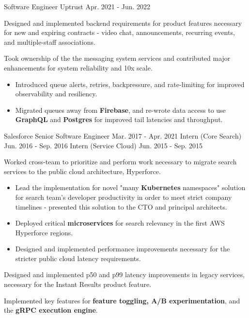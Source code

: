 
\begin{cventries}

  \cventry
    {Software Engineer} %
    {Uptrust} %
    {} %
    {Apr. 2021 - Jun. 2022} %
    {
      \begin{cvitems} %
        \item {Designed and implemented backend requirements for product features necessary for new and expiring contracts - video chat, announcements, recurring events, and multiple-staff associations.}
        \item {Took ownership of the the messaging system services and contributed major enhancements for system reliability and 10x scale.}
        \begin{itemize}
          \item {Introduced queue alerts, retries, backpressure, and rate-limiting for improved observability and resiliency.}
          \item {Migrated queues away from \textbf{Firebase}, and re-wrote data access to use \textbf{GraphQL} and \textbf{Postgres} for improved tail latencies and throughput.}
        \end{itemize}
      \end{cvitems}
    }

  \cvthreeentry
    {Salesforce} %
    {} %
    {Senior Software Engineer}
    {Mar. 2017 - Apr. 2021}
    {Intern (Core Search)}
    {Jun. 2016 - Sep. 2016}
    {Intern (Service Cloud)}
    {Jun. 2015 - Sep. 2015}
    {
      \begin{cvitems} %
      \item {Worked cross-team to prioritize and perform work necessary to migrate search services to the public cloud architecture, Hyperforce.}
        \begin{itemize}
          \item {Lead the implementation for novel "many \textbf{Kubernetes} namespaces" solution for search team's developer productivity in order to meet strict company timelines - presented this solution to the CTO and principal architects.}
          \item {Deployed critical \textbf{microservices} for search relevancy in the first AWS Hyperforce regions.}
          \item {Designed and implemented performance improvements necessary for the stricter public cloud latency requirements.}
        \end{itemize}
        \item {Designed and implemented p50 and p99 latency improvements in legacy services, necessary for the Instant Results product feature.}
        \item {Implemented key features for \textbf{feature toggling, A/B experimentation}, and the \textbf{gRPC execution engine}.}
      \end{cvitems}
    }


\end{cventries}
